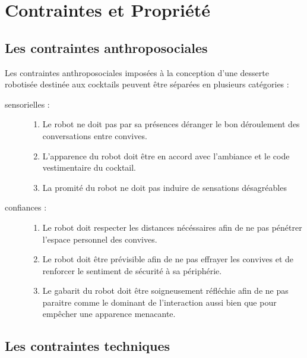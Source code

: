 \chapter{Contraintes et Propriété}

\section{Les contraintes anthroposociales}

Les contraintes anthroposociales imposées à la conception d'une desserte robotisée destinée aux cocktails peuvent être séparées en plusieurs catégories :
\begin{description}
\item[sensorielles :]
  \begin{enumerate}
  \item Le robot ne doit pas par sa présences déranger le bon déroulement des conversations entre convives.
  \item L'apparence du robot doit être en accord avec l'ambiance et le code vestimentaire du cocktail.
  \item La promité du robot ne doit pas induire de sensations désagréables
  \end{enumerate}
\item[confiances :]
  \begin{enumerate}
  \item Le robot doit respecter les distances nécéssaires afin de ne pas pénétrer l'espace personnel des convives.
  \item Le robot doit être prévisible afin de ne pas effrayer les convives et de renforcer le sentiment de sécurité à sa périphérie.
  \item Le gabarit du robot doit être soigneusement réfléchie afin de ne pas paraitre comme le dominant de l'interaction aussi bien que pour empêcher une apparence menacante.
  \end{enumerate}
\end{description}




\section{Les contraintes techniques}

